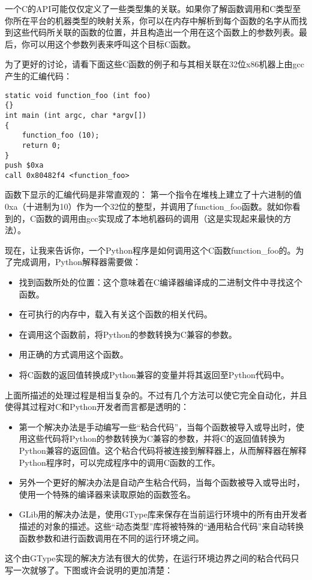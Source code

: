 一个C的API可能仅仅定义了一些类型集的关联。如果你了解函数调用和C类型至你所在平台的机器类型的映射关系，你可以在内存中解析到每个函数的名字从而找到这些代码所关联的函数的位置，并且构造出一个用在这个函数上的参数列表。最后，你可以用这个参数列表来呼叫这个目标C函数。

为了更好的讨论，请看下面这些C函数的例子和与其相关联在32位x86机器上由gcc产生的汇编代码：
\begin{verbatim}
static void function_foo (int foo)
{}
int main (int argc, char *argv[])
{
    function_foo (10);
    return 0;
}
push $0xa
call 0x80482f4 <function_foo>
\end{verbatim}
函数下显示的汇编代码是非常直观的： 第一个指令在堆栈上建立了十六进制的值0xa（十进制为10）作为一个32位的整型，并调用了function\_foo函数。就如你看到的，C函数的调用由gcc实现成了本地机器码的调用（这是实现起来最快的方法）。

现在，让我来告诉你，一个Python程序是如何调用这个C函数function\_foo的。为了完成调用，Python解释器需要做：

\begin{itemize}
	\item 找到函数所处的位置：这个意味着在C编译器编译成的二进制文件中寻找这个函数。
	\item 在可执行的内存中，载入有关这个函数的相关代码。
	\item 在调用这个函数前，将Python的参数转换为C兼容的参数。
	\item 用正确的方式调用这个函数。
	\item 将C函数的返回值转换成Python兼容的变量并将其返回至Python代码中。
\end{itemize}
上面所描述的处理过程是相当复杂的。不过有几个方法可以使它完全自动化，并且使得其过程对C和Python开发者而言都是透明的：
\begin{itemize}
	\item 第一个解决办法是手动编写一些“粘合代码”，当每个函数被导入或导出时，使用这些代码将Python的参数转换为C兼容的参数，并将C的返回值转换为 Python兼容的返回值。这个粘合代码将被连接到解释器上，从而解释器在解释Python程序时，可以完成程序中的调用C函数的工作。
	\item 另外一个更好的解决办法是自动产生粘合代码，当每个函数被导入或导出时，使用一个特殊的编译器来读取原始的函数签名。
	\item GLib用的解决办法是，使用GType库来保存在当前运行环境中的所有由开发者描述的对象的描述。这些“动态类型”库将被特殊的“通用粘合代码”来自动转换函数参数和进行函数调用在不同的运行环境之间。
\end{itemize}
这个由GType实现的解决方法有很大的优势，在运行环境边界之间的粘合代码只写一次就够了。下图或许会说明的更加清楚：

